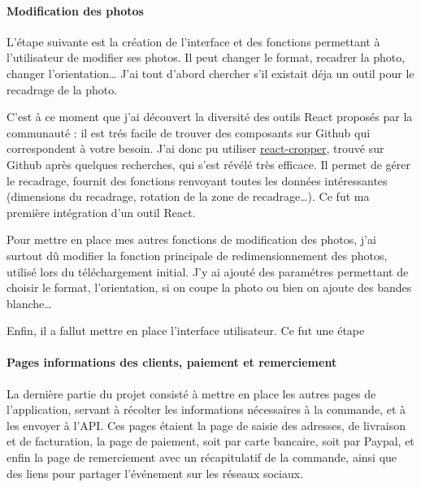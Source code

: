 \bigskip

\paragraph{Modification des photos}\label{modification-des-photos}

\bigskip

L'étape suivante est la création de l'interface et des fonctions
permettant à l'utilisateur de modifier ses photos. Il peut changer le
format, recadrer la photo, changer l'orientation\ldots{} J'ai tout
d'abord chercher s'il existait déja un outil pour le recadrage de la
photo.

\bigskip

C'est à ce moment que j'ai découvert la diversité des outils React
proposés par la communauté : il est trés facile de trouver des
composants sur Github qui correspondent à votre besoin. J'ai donc pu
utiliser
\href{https://github.com/roadmanfong/react-cropper}{react-cropper},
trouvé sur Github après quelques recherches, qui s'est révélé très
efficace. Il permet de gérer le recadrage, fournit des fonctions
renvoyant toutes les données intéressantes (dimensions du recadrage,
rotation de la zone de recadrage\ldots{}). Ce fut ma première
intégration d'un outil React.

\bigskip

Pour mettre en place mes autres fonctions de modification des photos,
j'ai surtout dû modifier la fonction principale de redimensionnement des
photos, utilisé lors du téléchargement initial. J'y ai ajouté des
paramétres permettant de choisir le format, l'orientation, si on coupe
la photo ou bien on ajoute des bandes blanche\ldots{}

\bigskip

Enfin, il a fallut mettre en place l'interface utilisateur. Ce fut une
étape

\paragraph{Pages informations des clients, paiement et
remerciement}\label{pages-informations-des-clients-paiement-et-remerciement}

\bigskip

La dernière partie du projet consisté à mettre en place les autres pages
de l'application, servant à récolter les informations nécessaires à la
commande, et à les envoyer à l'API. Ces pages étaient la page de saisie
des adresses, de livraison et de facturation, la page de paiement, soit
par carte bancaire, soit par Paypal, et enfin la page de remerciement
avec un récapitulatif de la commande, ainsi que des liens pour partager
l'événement sur les réseaux sociaux.


